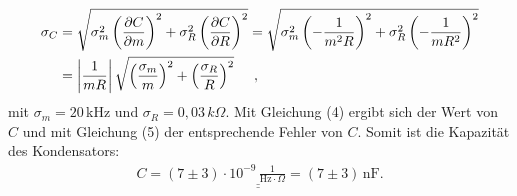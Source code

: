 \begin{align}
    \sigma_{C}&=\sqrt{\sigma_{m}^2 \left(\frac{\partial C}{\partial m}\right)^2 + \sigma_{R}^2 \left(\frac{\partial C}{\partial R}\right)^2 } = \sqrt{\sigma_{m}^2 \left(-\frac{1}{m^2R}\right)^2 + \sigma_{R}^2 \left(-\frac{1}{mR^2}\right)^2 }\nonumber\\
    &=\left|\frac{1}{mR}\right|\sqrt{ \left(\frac{\sigma_{m}}{m}\right)^2 +  \left(\frac{\sigma_{R}}{R}\right)^2 }\hspace{0,5cm},
\end{align}
mit $\sigma_m=20\,$kHz und $\sigma_R=0,03\,k\Omega$. Mit Gleichung (4) ergibt sich der Wert von $C$ und mit Gleichung (5) der entsprechende Fehler von $C$. Somit ist die Kapazität des Kondensators:
\begin{align*}
  \underline{\underline{C=(7\pm3)\cdot 10^{-9}\,\frac{1}{\text{Hz}\cdot\Omega}=(7\pm3)\,\text{nF}}}.
\end{align*}
\newpage
